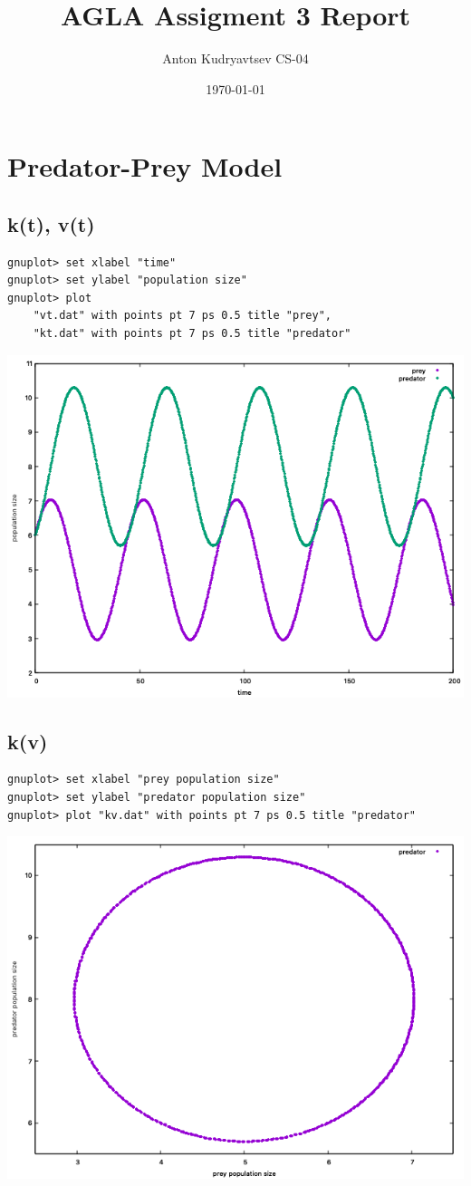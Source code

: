 \documentclass{article}
\title{AGLA Assigment 3 Report}
\author{Anton Kudryavtsev CS-04}
\date{\today}
\begin{document}
\maketitle

\section*{Predator-Prey Model}
\graphicspath{ {./} }
\subsection*{k(t), v(t)}
\begin{lstlisting}
gnuplot> set xlabel "time"
gnuplot> set ylabel "population size"
gnuplot> plot
    "vt.dat" with points pt 7 ps 0.5 title "prey",
    "kt.dat" with points pt 7 ps 0.5 title "predator"
\end{lstlisting}
\includegraphics[scale=0.6]{vtkt.png}
\subsection*{k(v)}
\begin{lstlisting}
gnuplot> set xlabel "prey population size"
gnuplot> set ylabel "predator population size"
gnuplot> plot "kv.dat" with points pt 7 ps 0.5 title "predator"
\end{lstlisting}
\includegraphics[scale=0.6]{kv.png}
\end{document}
